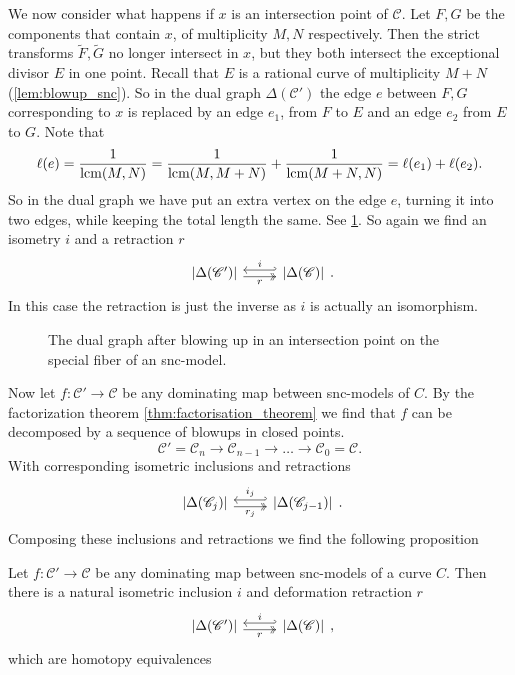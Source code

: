 We now consider what happens if $x$ is an intersection point of $\mathscr C$. 
Let $F, G$ be the components that contain $x$, of multiplicity $M, N$ respectively. 
Then the strict transforms $\tilde F, \tilde G$ no longer intersect in $x$, but they both intersect the exceptional divisor $E$ in one point. 
Recall that $E$ is a rational curve of multiplicity $M + N$ (\cref{lem:blowup_snc}). 
So in the dual graph $\Delta(\mathscr C')$ the edge $e$ between $F, G$ corresponding to $x$ is replaced by an edge $e_1$, from $F$ to $E$ and an edge $e_2$ from $E$ to $G$. 
Note that \[
	\ell(e) = \frac{1}{\operatorname{lcm}(M, N)} = \frac{1}{\operatorname{lcm}(M, M + N)} + \frac{1}{\operatorname{lcm}(M+ N, N)} = \ell(e_1) + \ell(e_2)
.\]  
So in the dual graph we have put an extra vertex on the edge $e$, turning it into two edges, while keeping the total length the same.
See \cref{fig:blowup_intersection_points_skeleton}. 
So again we find an isometry $i$ and a retraction $r$
\[
\begin{tikzcd}
	{|\Delta(\mathscr C')|} \rar[hookleftarrow, shift left]{i} \rar[twoheadrightarrow, shift right, ']{r} & {|\Delta(\mathscr C)|} 
\end{tikzcd}
.\] 
In this case the retraction is just the inverse as $i$ is actually an isomorphism. 

\begin{figure}[ht]
    \centering
    \caption{The dual graph after blowing up in an intersection point on the special fiber of an snc-model. }
    \label{fig:blowup_intersection_points_skeleton}
\end{figure}

Now let $f:\mathscr C' \to \mathscr C$ be any dominating map between snc-models of $C$. 
By the factorization theorem \cref{thm:factorisation_theorem} we find that $f$ can be decomposed by a sequence of blowups in closed points. 
\[
\mathscr C' = \mathscr C_n \to \mathscr C_{n-1} \to \ldots \to \mathscr C_0 = \mathscr C
.\] 
With corresponding isometric inclusions and retractions 
\[
\begin{tikzcd}
	{|\Delta(\mathscr C_{j})|} \rar[hookleftarrow, shift left]{i_j} \rar[twoheadrightarrow, shift right, ']{r_j} & {|\Delta(\mathscr C_{j-1})|} 
\end{tikzcd}
.\] 
Composing these inclusions and retractions we find the following proposition
\begin{proposition}\label{prop:inclusion_retraction_dual_graph}
	Let $f:\mathscr C' \to \mathscr C$ be any dominating map between snc-models of a curve $C$. 
	Then there is a natural isometric inclusion $i$ and deformation retraction $r$
\[
\begin{tikzcd}
	{|\Delta(\mathscr C')|} \rar[hookleftarrow, shift left]{i} \rar[twoheadrightarrow, shift right, ']{r} & {|\Delta(\mathscr C)|} 
\end{tikzcd}
,\] 
	which are homotopy equivalences
\end{proposition}

